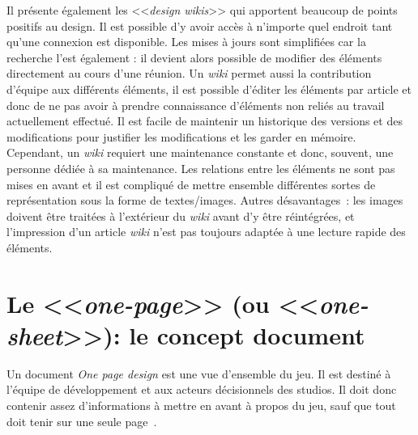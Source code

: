Il présente également les <<\emph{design wikis}>> qui apportent beaucoup de points positifs au design. Il est possible d'y avoir accès à n'importe quel endroit tant qu'une connexion est disponible. Les mises à jours sont simplifiées car la recherche l'est également : il devient alors possible de modifier des éléments directement au cours d'une réunion. Un \emph{wiki} permet aussi la contribution d'équipe aux différents éléments, il est possible d'éditer les éléments par article et donc de ne pas avoir à prendre connaissance d'éléments non reliés au travail actuellement effectué. Il est facile de maintenir un historique des versions et des modifications pour justifier les modifications et les garder en mémoire. Cependant, un \emph{wiki} requiert une maintenance constante et donc, souvent, une personne dédiée à sa maintenance. Les relations entre les éléments ne sont pas mises en avant et il est compliqué de mettre ensemble différentes sortes de représentation sous la forme de textes/images. Autres d\'esavantages~: les images doivent être traitées à l'extérieur du \emph{wiki} avant d'y être réintégrées, et l'impression d'un article \emph{wiki} n'est pas toujours adaptée à une lecture rapide des éléments.\\



\section{Le <<\emph{one-page}>> (ou <<\emph{one-sheet}>>): le concept document}




Un document \emph{One page design} est une vue d'ensemble du jeu. Il est destiné à l'équipe de développement et aux acteurs décisionnels des studios. Il doit donc contenir assez d'informations à mettre en avant à propos du jeu, sauf que tout doit tenir sur une seule page~\cite{LevelUpRogers2014}.


